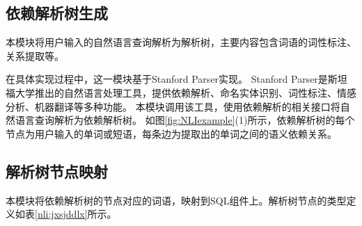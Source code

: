 
\subsection{依赖解析树生成}
\label{nli:yljxssc}

本模块将用户输入的自然语言查询解析为解析树，主要内容包含词语的词性标注、关系提取等。

在具体实现过程中，这一模块基于Stanford Parser\cite{de2018generating}实现。
Stanford Parser是斯坦福大学推出的自然语言处理工具，提供依赖解析、命名实体识别、词性标注、情感分析、机器翻译等多种功能。
本模块调用该工具，使用依赖解析的相关接口将自然语言查询解析为依赖解析树。
如图\ref{fig:NLIexample}(1)所示，依赖解析树的每个节点为用户输入的单词或短语，每条边为提取出的单词之间的语义依赖关系。

\subsection{解析树节点映射}
\label{nli:jxsjdys}
本模块将依赖解析树的节点对应的词语，映射到SQL组件上。解析树节点的类型定义如表\ref{nli:jxsjddlx}所示。


